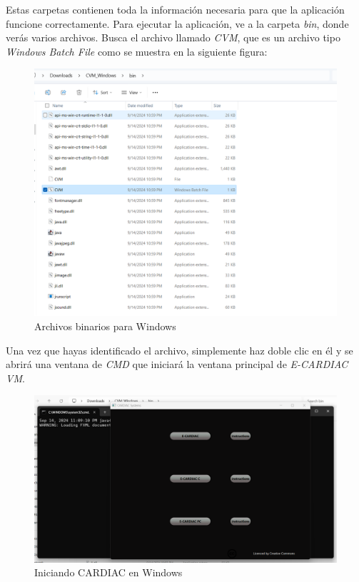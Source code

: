 \documentclass[letterpaper,12pt,oneside]{book}
\begin{document}
Estas carpetas contienen toda la información necesaria para que la aplicación funcione correctamente. Para ejecutar la aplicación, ve a la carpeta 
\textit{bin}, 
donde verás varios archivos. Busca el archivo llamado \textit{CVM}, que es un archivo tipo \textit{Windows Batch File} como se muestra en la 
siguiente figura:

\begin{figure}[h]		
				\centering
				\includegraphics[scale=0.4]{media_g/binary_files_windws.png}
				\caption{Archivos binarios para Windows }
				\label{fig:github_binaryfileswindows}
\end{figure}


Una vez que hayas identificado el archivo, simplemente haz doble clic en él y se abrirá una ventana de \textit{CMD} que iniciará la ventana principal de 
\textit{E-CARDIAC VM}.

\begin{figure}[h]		
				\centering
				\includegraphics[scale=0.5]{media_g/starting_cardiac_windows.png}
				\caption{Iniciando CARDIAC en Windows}
				\label{fig:github_startingcardiacwindows}
\end{figure}
\end{document}
